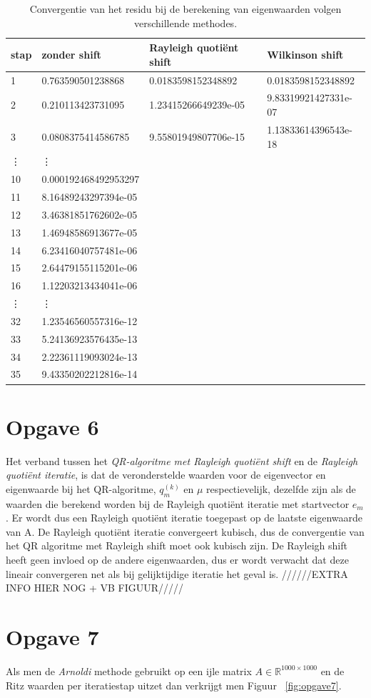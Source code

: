 \documentclass[a4paper]{article}
\newcommand{\opgave}[1]{\section*{Opgave #1}}
\begin{document}
\begin{table}[h]
\begin{tabular}{|l|l|l|l|}
\hline
stap & zonder shift & Rayleigh quoti\"{e}nt shift & Wilkinson shift \\
\hline
1 & 0.763590501238868 & 0.0183598152348892 & 0.0183598152348892 \\
2 & 0.210113423731095 & 1.23415266649239e-05 & 9.83319921427331e-07 \\
3 & 0.0808375414586785 & 9.55801949807706e-15 & 1.13833614396543e-18 \\
\vdots & \vdots &  &  \\
10 & 0.000192468492953297 &  &  \\
11 & 8.16489243297394e-05 &  &  \\
12 & 3.46381851762602e-05 &  &  \\
13 & 1.46948586913677e-05 &  &  \\
14 & 6.23416040757481e-06 &  &  \\
15 & 2.64479155115201e-06 &  &  \\
16 & 1.12203213434041e-06 &  &  \\
\vdots & \vdots &  &  \\
32 & 1.23546560557316e-12 &  &  \\
33 & 5.24136923576435e-13 &  &  \\
34 & 2.22361119093024e-13 &  &  \\
35 & 9.43350202212816e-14 &  &  \\
\hline
\end{tabular}
\caption{Convergentie van het residu bij de berekening van eigenwaarden volgen verschillende methodes.}
\label{table:tab2}
\end{table}
\opgave{6}
Het verband tussen het \textit{QR-algoritme met Rayleigh quoti\"{e}nt shift} en de \textit{Rayleigh quoti\"{e}nt iteratie}, is dat de veronderstelde waarden voor de eigenvector
en eigenwaarde bij het QR-algoritme, $q_m^{(k)}$ en $\mu$ respectievelijk, dezelfde zijn als de waarden
die berekend worden bij de Rayleigh quoti\"{e}nt iteratie met startvector $e_m$. Er wordt dus een Rayleigh quoti\"{e}nt iteratie toegepast op de laatste eigenwaarde van
A. De Rayleigh quoti\"{e}nt iteratie convergeert kubisch, dus de convergentie van het QR algoritme met Rayleigh shift moet ook kubisch zijn. De Rayleigh shift heeft geen invloed op de andere eigenwaarden, dus er wordt verwacht dat deze lineair convergeren net als bij gelijktijdige iteratie het geval is.
//////EXTRA INFO HIER NOG + VB FIGUUR/////
\opgave{7}
Als men de \textit{Arnoldi} methode gebruikt op een ijle matrix $A \in \mathbb{R}^{1000\times1000}$ en de Ritz waarden per iteratiestap uitzet dan verkrijgt men Figuur ~\ref{fig:opgave7}.
\end{document}
